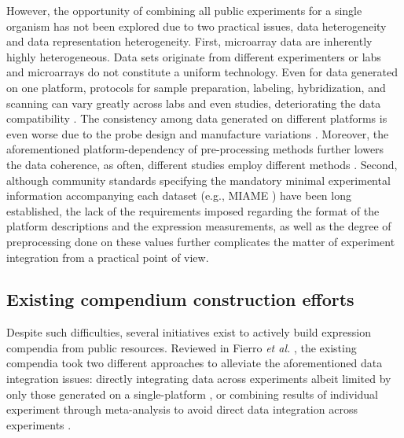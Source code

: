 However, the opportunity of combining all public experiments for a single organism has not been explored due to two practical issues, data heterogeneity and data representation heterogeneity. First, microarray data are inherently highly heterogeneous. Data sets originate from different experimenters or labs and microarrays do not constitute a uniform technology. Even for data generated on one platform, protocols for sample preparation, labeling, hybridization, and scanning can vary greatly across labs and even studies, deteriorating the data compatibility \cite{Bammler2005, Irizarry2005}. The consistency among data generated on different platforms is even worse due to the probe design and manufacture variations \cite{Sasik2004, Draghici2006}. Moreover, the aforementioned platform-dependency of pre-processing methods further lowers the data coherence, as often, different studies employ different methods \cite{Irizarry2005, Shi2006, Stafford2007}. Second, although community standards specifying the mandatory minimal experimental information accompanying each dataset (e.g., MIAME \cite{Brazma2001}) have been long established, the lack of the requirements \cite{Brazma2009} imposed regarding the format of the platform descriptions and the expression measurements, as well as the degree of preprocessing done on these values further complicates the matter of experiment integration from a practical point of view. 


\subsection{Existing compendium construction efforts}

Despite such difficulties, several initiatives exist to actively build expression compendia from public resources. Reviewed in Fierro \textit{et al.} \cite{Fierro2008}, the existing compendia took two different approaches to alleviate the aforementioned data integration issues: directly integrating data across experiments albeit limited by only those generated on a single-platform \cite{Faith2008, Hruz2008}, or combining results of individual experiment through meta-analysis to avoid direct data integration across experiments \cite{Rhodes2007, Pan2007, Elfilali2006,   Kapushesky2010, Culhane2012}.



